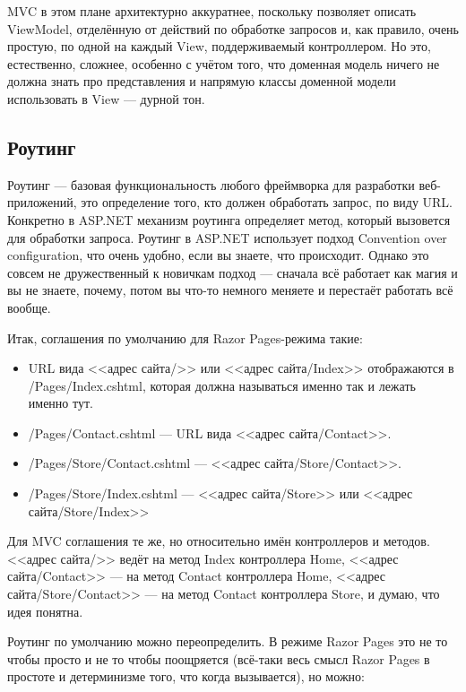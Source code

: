 \documentclass[a5paper]{article}
\begin{document}
MVC в этом плане архитектурно аккуратнее, поскольку позволяет описать ViewModel, отделённую от действий по обработке запросов и, как правило, очень простую, по одной на каждый View, поддерживаемый контроллером. Но это, естественно, сложнее, особенно с учётом того, что доменная модель ничего не должна знать про представления и напрямую классы доменной модели использовать в View --- дурной тон.

\subsection{Роутинг}

Роутинг --- базовая функциональность любого фреймворка для разработки веб-приложений, это определение того, кто должен обработать запрос, по виду URL. Конкретно в ASP.NET механизм роутинга определяет метод, который вызовется для обработки запроса. Роутинг в ASP.NET использует подход Convention over configuration, что очень удобно, если вы знаете, что происходит. Однако это совсем не дружественный к новичкам подход --- сначала всё работает как магия и вы не знаете, почему, потом вы что-то немного меняете и перестаёт работать всё вообще.

Итак, соглашения по умолчанию для Razor Pages-режима такие:

\begin{itemize}
    \item URL вида <<адрес сайта/>> или <<адрес сайта/Index>> отображаются в /Pages/Index.cshtml, которая должна называться именно так и лежать именно тут.
    \item /Pages/Contact.cshtml --- URL вида <<адрес сайта/Contact>>.
    \item /Pages/Store/Contact.cshtml --- <<адрес сайта/Store/Contact>>.
    \item /Pages/Store/Index.cshtml --- <<адрес сайта/Store>> или <<адрес сайта/Store/Index>>
\end{itemize}

Для MVC соглашения те же, но относительно имён контроллеров и методов. <<адрес сайта/>> ведёт на метод Index контроллера Home, <<адрес сайта/Contact>> --- на метод Contact контроллера Home, <<адрес сайта/Store/Contact>> --- на метод Contact контроллера Store, и думаю, что идея понятна.

Роутинг по умолчанию можно переопределить. В режиме Razor Pages это не то чтобы просто и не то чтобы поощряется (всё-таки весь смысл Razor Pages в простоте и детерминизме того, что когда вызывается), но можно:
\end{document}
